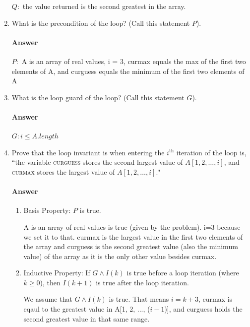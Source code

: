 \documentclass{article}
\begin{document}
\begin{enumerate}
        $Q\colon$ the value returned is the second greatest in the array.

    \item What is the precondition of the loop? (Call this statement $P$).

        \paragraph{Answer}

       $P\colon$ A is an array of real values, i = 3, curmax equals the max of the first two elements of A, and curguess equals the minimum of the first two elements of A

    \item What is the loop guard of the loop? (Call this statement $G$).

        \paragraph{Answer}

        $G\colon i \leq A.length$

    \item Prove that the loop invariant is when entering the $i^\text{th}$
        iteration of the loop is, ``the variable \textsc{curguess} stores
        the second
        largest value of $A[1,2, \ldots, i]$,
        and \textsc{curmax} stores the largest value of $A[1,2,\ldots, i]$."

        \paragraph{Answer}
\begin{enumerate}
	\item Basis Property: $P$ is true.
	
	A is an array of real values is true (given by the problem). i=3 because we set it to that. curmax is the largest value in the first two elements of the array and curguess is the second greatest value (also the minimum value) of the array as it is the only other value besides curmax.
	
	\item Inductive Property: If $G \land I(k)$ is true before a loop iteration (where $k \geq 0$), then $I(k+1)$ is true after the loop iteration.
	
	We assume that $G \land I(k)$ is true. That means $i = k+3$, curmax is eqaul to the greatest value in A[1, 2, ..., ($i-1$)], and curguess holds the second greatest value in that same range.
	

\end{enumerate}
\end{enumerate}
\end{document}

